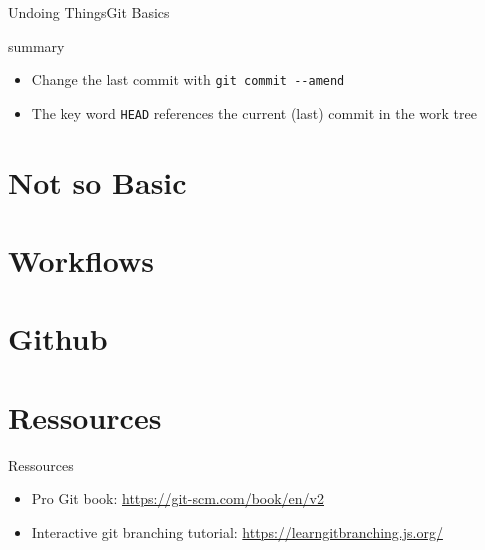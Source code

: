 \documentclass[aspectratio=169]{beamer}
\begin{document}
\begin{frame}[fragile]{Undoing Things}{Git Basics}
\begin{block}{summary}
\begin{itemize}
	\item Change the last commit with \verb|git commit --amend|
	\item The key word \verb|HEAD| references the current (last) commit in the work tree
\end{itemize}
\end{block}
\end{frame}

\section{Not so Basic}
\section{Workflows}
\section{Github}
\section{Ressources}
\begin{frame}{Ressources}
\begin{itemize}
	\item Pro Git book: \url{https://git-scm.com/book/en/v2}
	\item Interactive git branching tutorial: \url{https://learngitbranching.js.org/}
\end{itemize}
\end{frame}
\end{document}
